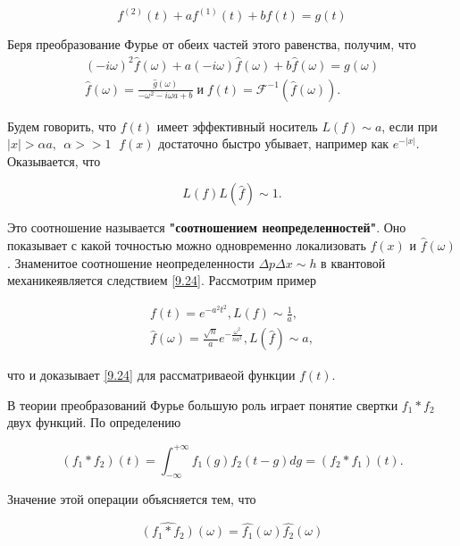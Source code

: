 \begin{equation}\label{9.22}
f^{(2)}(t) + a f^{(1)}(t) + bf(t) = g(t)
\end{equation}

Беря преобразование Фурье от обеих частей этого равенства, получим, что 
\begin{equation}\label{9.23}
\begin{gathered}
(-i\omega)^2 \hat{f}(\omega) + a(-i\omega) \hat{f}(\omega)+b\hat{f}(\omega) = g(\omega) \\
\hat{f}(\omega) = \frac{\hat{g}(\omega)}{-\omega^2-i\omega a + b} \; \text{и} \; f(t)= \mathscr{F}^{-1} (\hat{f}(\omega)).
\end{gathered}
\end{equation}

Будем говорить, что $f(t)$ имеет эффективный носитель $L(f) \sim a$, если при $|x|>\alpha a $,  $\;\alpha >> 1 \;$ $f(x)$ достаточно быстро убывает, например как $e^{-|x|}$. Оказывается, что 

\begin{equation}\label{9.24}
L(f) L(\hat{f}) \sim 1.
\end{equation}

Это соотношение называется \textbf{"соотношением неопределенностей"}. Оно показывает с какой точностью можно одновременно локализовать $f(x)$ и $\hat{f}(\omega)$. Знаменитое соотношение неопределенности $\Delta p \Delta x \sim h$ в квантовой механикеявляется следствием \ref{9.24}. Рассмотрим пример

\begin{equation}\label{9.25}
\begin{gathered}
f(t)=e^{-a^2t^2}, L(f) \sim \frac{1}{a},\\
\hat{f}(\omega)=\frac{\sqrt{n}}{a} e^{-\frac{\omega^2}{na^2}}, L(\hat{f}) \sim a,
\end{gathered}
\end{equation}

что и доказывает \ref{9.24} для рассматриваеой функции $f(t)$.

В теории преобразований Фурье большую роль играет понятие свертки $f_1*f_2 $ двух функций. 
По определению 

\begin{equation}\label{9.26}
(f_1*f_2)(t) = \int_{-\infty}^{+\infty}f_1(g)f_2(t-g)dg = (f_2*f_1)(t).
\end{equation}

Значение этой операции объясняется тем, что

\begin{equation}\label{9.27}
\hat{(f_1*f_2)}(\omega) = \hat{f_1}(\omega)\hat{f_2}(\omega)
\end{equation}

